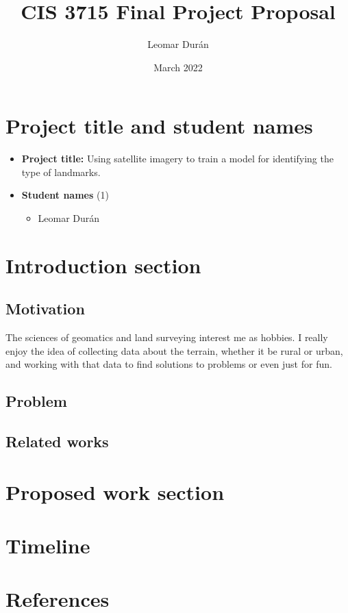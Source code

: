 \documentclass[11pt]{article}
\title{CIS 3715 Final Project Proposal}
\author{Leomar Durán}
\date{March 2022}
\begin{document}
\section{Project title and student names}
\begin{itemize}
    \item
        \textbf{Project title:} Using satellite imagery to train a model for identifying the type of landmarks.
    \item
        \textbf{Student names} (1)
        \begin{itemize}
            \item
                Leomar Durán
        \end{itemize}
\end{itemize}

\section{Introduction section}

\subsection{Motivation}

The sciences of geomatics and land surveying interest me as hobbies. I really enjoy the idea of collecting data about the terrain, whether it be rural or urban, and working with that data to find solutions to problems or even just for fun.

\subsection{Problem}

\subsection{Related works}

\section{Proposed work section}
\section{Timeline}
\section{References}
\end{document}
